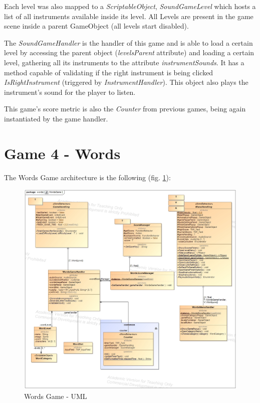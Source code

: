 Each level was also mapped to a \textit{ScriptableObject}, \textit{SoundGameLevel} which hosts a list of all instruments available inside its level. All Levels are present in the game scene inside a parent GameObject (all levels start disabled).

The \textit{SoundGameHandler} is the handler of this game and is able to load a certain level by accessing the parent object (\textit{levelsParent} attribute) and loading a certain level, gathering all its instruments to the attribute \textit{instrumentSounds}.
It has a method capable of validating if the right instrument is being clicked \textit{IsRightInstrument} (triggered by \textit{InstrumentHandler}).
This object also plays the instrument's sound for the player to listen.

This game's score metric is also the \textit{Counter} from previous games, being again instantiated by the game handler.

\newpage
\section{Game 4 - Words}

The Words Game architecture is the following (fig. \ref*{fig:wordsGameArq}):

\begin{figure}[!h]
    \centering
    \includegraphics[width=\linewidth]{Chapters/new_architechture/class__words__WordsGame.jpg}
    \caption{Words Game - UML}
    \label{fig:wordsGameArq}
\end{figure}

